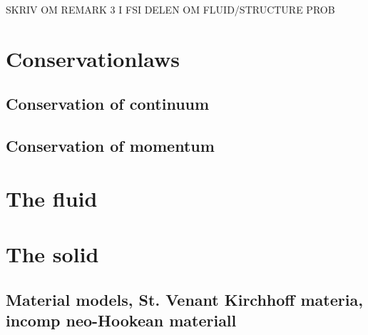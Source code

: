 SKRIV OM REMARK 3 I FSI DELEN OM FLUID/STRUCTURE PROB

\section{Conservationlaws}
\subsection{Conservation of continuum}
\subsection{Conservation of momentum}

\section{The fluid}

\section{The solid}

\subsection{Material models, St. Venant Kirchhoff materia, incomp neo-Hookean materiall}


